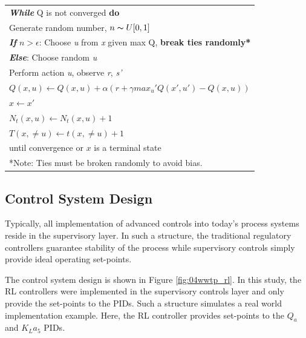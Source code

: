 \begin{table}[h]
\begin{tabular}{p{15cm}}
		\hspace{1cm} \textbf{\emph{While}} Q is not converged \textbf{do} \\
		\hspace{2cm} Generate random number, $n \thicksim U[0, 1]$ \\
		\hspace{2cm} \textbf{\emph{If}} $n > \epsilon$: Choose \emph{u} from \emph{x} given max Q, \textbf{break ties randomly*} \\
		\hspace{2cm} \textbf{\emph{Else}}: Choose random \emph{u} \\
		\hspace{2cm} Perform action \emph{u}, observe \emph{r}, \emph{s'} \\
		\hspace{2cm} $Q(x, u) \leftarrow Q(x, u) + \alpha(r + \gamma max_u' Q(x', u') - Q(x, u))$ \\
		\hspace{2cm} $x \leftarrow x'$ \\
		\hspace{2cm} $N_t(x, u) \leftarrow N_t(x, u) + 1$ \\
		\hspace{2cm} $T(x, \neq u) \leftarrow t(x, \neq u) + 1$ \\
		\hspace{1cm} until convergence or $x$ is a terminal state \\ \hline
		*Note: Ties must be broken randomly to avoid bias.
	\end{tabular}
\end{table}

\subsection{Control System Design}
Typically, all implementation of advanced controls into today's process systems reside in the supervisory layer. In such a structure, the traditional regulatory controllers guarantee stability of the process while supervisory controls simply provide ideal operating set-points.

The control system design is shown in Figure \ref{fig:04wwtp_rl}. In this study, the RL controllers were implemented in the supervisory controls layer and only provide the set-points to the PIDs. Such a structure simulates a real world implementation example. Here, the RL controller provides set-points to the $Q_a$ and $K_La_5$ PIDs.

